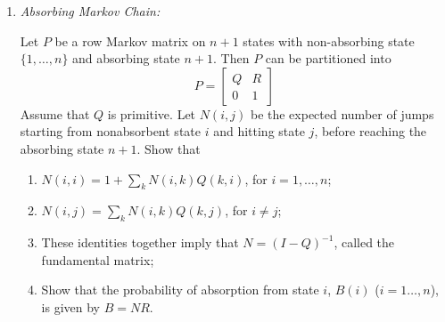 \documentclass[11pt]{article}
\begin{document}
\begin{enumerate}
\item {\em Absorbing Markov Chain:} 

Let $P$ be a row Markov matrix on $n+1$ states with non-absorbing state $\{1,\ldots,n\}$ and absorbing state $n+1$. Then $P$ can be partitioned into 
\[
	P=\left[
	\begin{array}{cc} 
	Q & R \\ 
	0 & 1 
	\end{array} \right]
\]
Assume that $Q$ is primitive. Let $N(i,j)$ be the expected number of jumps starting from nonabsorbent state $i$ and hitting state $j$, before reaching the absorbing state $n+1$. Show
that
\begin{enumerate}
\item $N(i,i) = 1 + \sum_k N(i,k) Q(k,i)$, for $i=1,\ldots,n$;
\item $N(i,j) = \sum_k N(i,k) Q(k,j)$, for $i\neq j$;
\item These identities together imply that $N=(I-Q)^{-1}$, called the fundamental matrix; 
\item Show that the probability of absorption from state $i$, $B(i)$ ($i=1\ldots,n$), is given by $B=NR$.   
\end{enumerate}


\end{enumerate}
\end{document}
